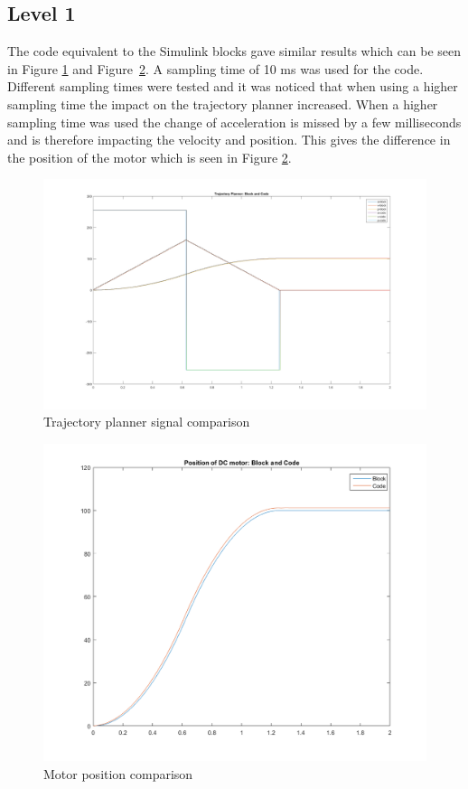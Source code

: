 %
%


%

\subsection*{Level 1}
The code equivalent to the Simulink blocks gave similar results which
can be seen in Figure \ref{fig:task2_traj} and
Figure~\ref{fig:task2_pos}. A sampling time of 10 ms was used for the
code. Different sampling times were tested and it was noticed that
when using a higher sampling time the impact on the trajectory planner
increased. When a higher sampling time was used the change of
acceleration is missed by a few milliseconds and is therefore impacting the
velocity and position. This gives the difference in the position of the
motor which is seen in Figure \ref{fig:task2_pos}.
\begin{figure}[H]
	\begin{center}
	
		\includegraphics[width=0.45\linewidth]{task2_traj.png}
		\caption{Trajectory planner signal comparison}
		\label{fig:task2_traj}
	\end{center}
\end{figure}
\begin{figure}[H]
	\begin{center}
	
		\includegraphics[width=0.45\linewidth]{task2_position.png}
		\caption{Motor position comparison}
		\label{fig:task2_pos}
	\end{center}
\end{figure}

